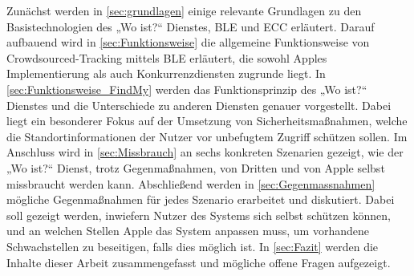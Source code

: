 Zunächst werden in \autoref{sec:grundlagen} einige relevante Grundlagen zu den Basistechnologien des „Wo ist?“ Dienstes, \ac{BLE} und \ac{ECC} erläutert.
Darauf aufbauend wird in \autoref{sec:Funktionsweise} die allgemeine Funktionsweise von Crowdsourced-Tracking mittels \ac{BLE} erläutert, die sowohl Apples Implementierung als auch Konkurrenzdiensten zugrunde liegt.
In \autoref{sec:Funktionsweise_FindMy} werden das Funktionsprinzip des „Wo ist?“ Dienstes und die Unterschiede zu anderen Diensten genauer vorgestellt.
Dabei liegt ein besonderer Fokus auf der Umsetzung von Sicherheitsmaßnahmen, welche die Standortinformationen der Nutzer vor unbefugtem Zugriff schützen sollen.
Im Anschluss wird in \autoref{sec:Missbrauch} an sechs konkreten Szenarien gezeigt, wie der „Wo ist?“ Dienst, trotz Gegenmaßnahmen, von Dritten und von Apple selbst missbraucht werden kann.
Abschließend werden in \autoref{sec:Gegenmassnahmen} mögliche Gegenmaßnahmen für jedes Szenario erarbeitet und diskutiert.
Dabei soll gezeigt werden, inwiefern Nutzer des Systems sich selbst schützen können, und an welchen Stellen Apple das System anpassen muss, um vorhandene Schwachstellen zu beseitigen, falls dies möglich ist.
In \autoref{sec:Fazit} werden die Inhalte dieser Arbeit zusammengefasst und mögliche offene Fragen aufgezeigt. %